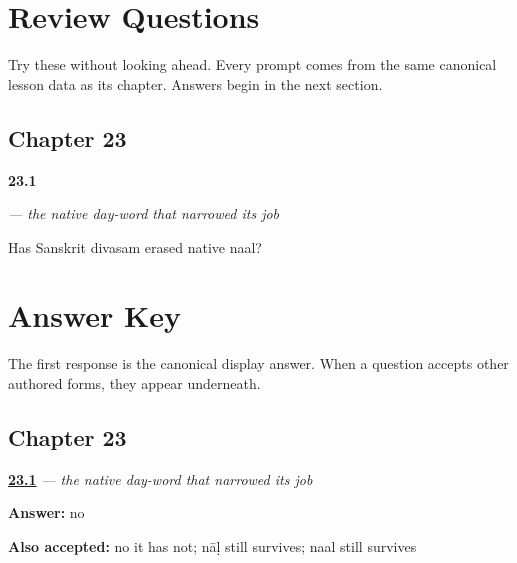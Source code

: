 
\chapter*{Review Questions}

Try these without looking ahead. Every prompt comes from the same canonical lesson data as its chapter. Answers begin in the next section.

\section*{Chapter 23}

\noindent\begin{minipage}[t]{\linewidth}
\raggedright
\hypertarget{review-ML-C23-naal-survival}{\textbf{23.1}} \emph{ — the native day-word that narrowed its job}\par
\small Has Sanskrit divasam erased native naal?
\end{minipage}\par\medskip

\chapter*{Answer Key}

The first response is the canonical display answer. When a question accepts other authored forms, they appear underneath.

\section*{Chapter 23}

\noindent\begin{minipage}[t]{\linewidth}
\raggedright
\hyperlink{review-ML-C23-naal-survival}{\textbf{23.1}} \emph{ — the native day-word that narrowed its job}\par
\small \textbf{Answer:} no\par
\footnotesize \textbf{Also accepted:} no it has not; nāḷ still survives; naal still survives
\end{minipage}\par\medskip
